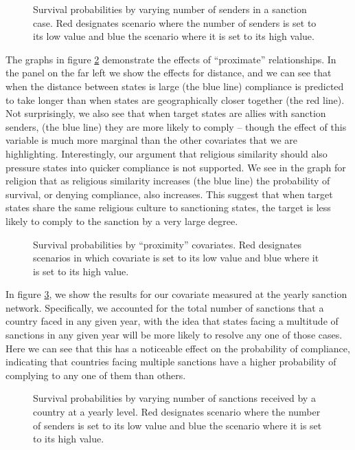 \begin{figure}[ht]
	\centering
	\caption{Survival probabilities by varying number of senders in a sanction case. Red designates scenario where the number of senders is set to its low value and blue the scenario where it is set to its high value.}
	\resizebox{0.7\textwidth}{!}{}
	\label{fig:surv1}
\end{figure}
\FloatBarrier

The graphs in figure \ref{fig:surv2} demonstrate the effects of ``proximate'' relationships. In the panel on the far left we show the effects for distance, and we can see that when the distance between states is large (the blue line) compliance is predicted to take longer than when states are geographically closer together (the red line). Not surprisingly, we also see that when target states are allies with sanction senders, (the blue line) they are more likely to comply -- though the effect of this variable is much more marginal than the other covariates that we are highlighting. Interestingly, our argument that religious similarity should also pressure states into quicker compliance is not supported. We see in the graph for religion that as religious similarity increases (the blue line) the probability of survival, or denying compliance, also increases. This suggest that when target states share the same religious culture to sanctioning states, the target is less likely to comply to the sanction by a very large degree.

\begin{figure}[ht]
	\centering
	\caption{Survival probabilities by ``proximity'' covariates. Red designates scenarios in which covariate is set to its low value and blue where it is set to its high value.}
	\resizebox{1\textwidth}{!}{}	
	\label{fig:surv2}
\end{figure}
\FloatBarrier

In figure \ref{fig:surv3}, we show the results for our covariate measured at the yearly sanction network. Specifically, we accounted for the total number of sanctions that a country faced in any given year, with the idea that states facing a multitude of sanctions in any given year will be more likely to resolve any one of those cases. Here we can see that this has a noticeable effect on the probability of compliance, indicating that countries facing multiple sanctions have a higher probability of complying to any one of them than others. 

\begin{figure}[ht]
	\centering
	\caption{Survival probabilities by varying number of sanctions received by a country at a yearly level. Red designates scenario where the number of senders is set to its low value and blue the scenario where it is set to its high value.}
	\resizebox{0.7\textwidth}{!}{}	
	\label{fig:surv3}	
\end{figure}
\FloatBarrier